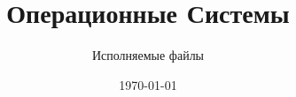 \documentclass[12pt,t]{beamer}
\title{Операционные Системы}
\subtitle{Исполняемые файлы}
\date{\today}
\begin{document}
  \begin{frame}
    \titlepage
  \end{frame}
  
  
\end{document}
